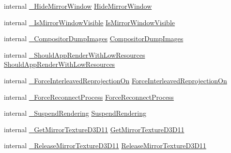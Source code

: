 \begin{DoxyCompactItemize}
\item 
internal \mbox{\hyperlink{struct_valve_1_1_v_r_1_1_i_v_r_compositor_ae7894fcd457855bc576170f3ef45a658}{\+\_\+\+Hide\+Mirror\+Window}} \mbox{\hyperlink{struct_valve_1_1_v_r_1_1_i_v_r_compositor_a9682d6250bef4cba9b16528818ca241d}{Hide\+Mirror\+Window}}
\item 
internal \mbox{\hyperlink{struct_valve_1_1_v_r_1_1_i_v_r_compositor_a709b0f249fd12044c3c24298e0794585}{\+\_\+\+Is\+Mirror\+Window\+Visible}} \mbox{\hyperlink{struct_valve_1_1_v_r_1_1_i_v_r_compositor_a6fc49d73e29d2dead001115ec3a6e8cc}{Is\+Mirror\+Window\+Visible}}
\item 
internal \mbox{\hyperlink{struct_valve_1_1_v_r_1_1_i_v_r_compositor_a351b398aced3747ea129a949a86c5293}{\+\_\+\+Compositor\+Dump\+Images}} \mbox{\hyperlink{struct_valve_1_1_v_r_1_1_i_v_r_compositor_a3fead654c9ee024f9b7becf3150f5214}{Compositor\+Dump\+Images}}
\item 
internal \mbox{\hyperlink{struct_valve_1_1_v_r_1_1_i_v_r_compositor_aa6f4f906ffd776b1d99a73db6224e3dd}{\+\_\+\+Should\+App\+Render\+With\+Low\+Resources}} \mbox{\hyperlink{struct_valve_1_1_v_r_1_1_i_v_r_compositor_aacc73748f1dfc0e1fdcfeb5129525a66}{Should\+App\+Render\+With\+Low\+Resources}}
\item 
internal \mbox{\hyperlink{struct_valve_1_1_v_r_1_1_i_v_r_compositor_a36094af51a8c04b9a3e162457ce669b9}{\+\_\+\+Force\+Interleaved\+Reprojection\+On}} \mbox{\hyperlink{struct_valve_1_1_v_r_1_1_i_v_r_compositor_ac8929e7619ebe2ffa6a379f5ff7e29cd}{Force\+Interleaved\+Reprojection\+On}}
\item 
internal \mbox{\hyperlink{struct_valve_1_1_v_r_1_1_i_v_r_compositor_a41854e10b434af0c1747fdb05b91098f}{\+\_\+\+Force\+Reconnect\+Process}} \mbox{\hyperlink{struct_valve_1_1_v_r_1_1_i_v_r_compositor_ae9c9a863909027b2a1abb60d474010fe}{Force\+Reconnect\+Process}}
\item 
internal \mbox{\hyperlink{struct_valve_1_1_v_r_1_1_i_v_r_compositor_a52c4de7b702770e872b7ef001d8c6b32}{\+\_\+\+Suspend\+Rendering}} \mbox{\hyperlink{struct_valve_1_1_v_r_1_1_i_v_r_compositor_a9a65d3f0ab17d11d1771dcd4167d9092}{Suspend\+Rendering}}
\item 
internal \mbox{\hyperlink{struct_valve_1_1_v_r_1_1_i_v_r_compositor_a9046a6da4f9d12e76f42e8476d698cc5}{\+\_\+\+Get\+Mirror\+Texture\+D3\+D11}} \mbox{\hyperlink{struct_valve_1_1_v_r_1_1_i_v_r_compositor_a9a72d670b1de214f0d2d6d8fd5ae46b4}{Get\+Mirror\+Texture\+D3\+D11}}
\item 
internal \mbox{\hyperlink{struct_valve_1_1_v_r_1_1_i_v_r_compositor_a79364707bc336637d4790df0a5949c2f}{\+\_\+\+Release\+Mirror\+Texture\+D3\+D11}} \mbox{\hyperlink{struct_valve_1_1_v_r_1_1_i_v_r_compositor_aa8f5713024670c41ee1018e6692b371d}{Release\+Mirror\+Texture\+D3\+D11}}

\end{DoxyCompactItemize}
